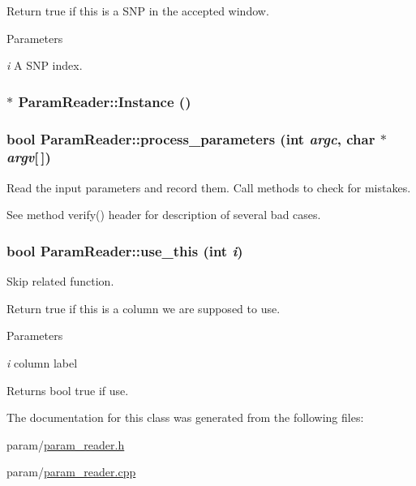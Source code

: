 Return true if this is a SNP in the accepted window. 
\begin{DoxyParams}{Parameters}
\item[{\em i}]A SNP index. \end{DoxyParams}
\hypertarget{classParamReader_a418f7d1f1bf0ad4cb3a6e7aaccc9ead3}{
\subsubsection[{Instance}]{ $\ast$ ParamReader::Instance ()}}
\label{classParamReader_a418f7d1f1bf0ad4cb3a6e7aaccc9ead3}
\hypertarget{classParamReader_aeccf4ded55394619359a2c85bc163b57}{
\subsubsection[{process\_\-parameters}]{\setlength{\rightskip}{0pt plus 5cm}bool ParamReader::process\_\-parameters (int {\em argc}, \/  char $\ast$ {\em argv}\mbox{[}$\,$\mbox{]})}}
\label{classParamReader_aeccf4ded55394619359a2c85bc163b57}
Read the input parameters and record them. Call methods to check for mistakes.

See method verify() header for description of several bad cases. \hypertarget{classParamReader_a3b1cf53fc0ed5ffd32744852f7c0015d}{
\subsubsection[{use\_\-this}]{\setlength{\rightskip}{0pt plus 5cm}bool ParamReader::use\_\-this (int {\em i})}}
\label{classParamReader_a3b1cf53fc0ed5ffd32744852f7c0015d}


Skip related function. 

Return true if this is a column we are supposed to use. 
\begin{DoxyParams}{Parameters}
\item[{\em i}]column label \end{DoxyParams}
\begin{DoxyReturn}{Returns}
bool true if use. 
\end{DoxyReturn}


The documentation for this class was generated from the following files:\begin{DoxyCompactItemize}
\item 
param/\hyperlink{param__reader_8h}{param\_\-reader.h}\item 
param/\hyperlink{param__reader_8cpp}{param\_\-reader.cpp}\end{DoxyCompactItemize}
